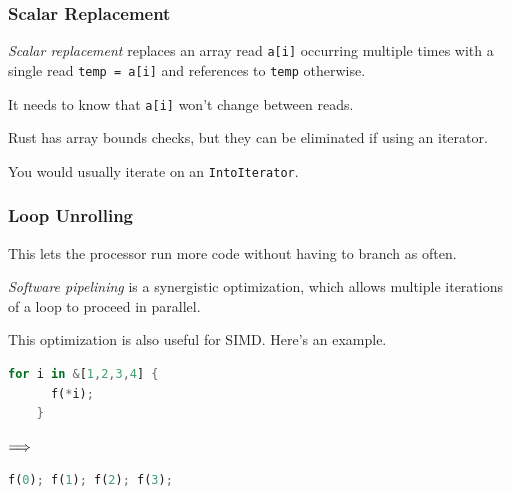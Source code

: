 \begin{frame}
\frametitle{Scalar Replacement}

\emph{Scalar replacement} replaces an array read {\tt a[i]}
occurring multiple times with a single read {\tt temp = a[i]} and references
to {\tt temp} otherwise. 

It needs to know that {\tt a[i]} won't change
between reads.

Rust has array bounds checks, but they can be eliminated if using an iterator.

You would usually iterate on an \texttt{IntoIterator}.


\end{frame}

\begin{frame}[fragile]
\frametitle{Loop Unrolling}

This
lets the processor run more code without having to branch
as often. 

\emph{Software pipelining} is a synergistic optimization,
which allows multiple iterations of a loop to proceed in parallel.


This optimization is also useful for SIMD. Here's an example.
\begin{center}
\vspace*{-1em}
\begin{minipage}{.3\textwidth}
  \begin{lstlisting}[language=Rust]
    for i in &[1,2,3,4] {
      f(*i);
    }
  \end{lstlisting}
  \end{minipage} $\Longrightarrow \hspace*{2em}$ \begin{minipage}{.4\textwidth}
  \begin{lstlisting}[language=Rust]
f(0); f(1); f(2); f(3);
  \end{lstlisting}
  \end{minipage}
  \end{center}

\end{frame}

